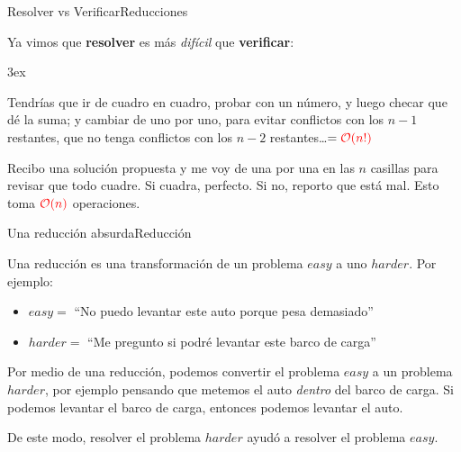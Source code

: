 \documentclass[spanish, c]{beamer}
\newcommand{\bigO}{\mathcal{O}}
\begin{document}
\begin{frame}{Resolver vs Verificar}{Reducciones}

    Ya vimos que \textbf{resolver} es más \textit{difícil} que \textbf{verificar}:

    \bigskip

    \begin{description}[style=unboxed]
        \itemsep3ex
        \item [Resolver un sudoku.]
        Tendrías que ir de cuadro en cuadro, probar con un número, y luego checar que dé la suma; y cambiar de uno por uno, para evitar conflictos con los $n-1$ restantes, que no tenga conflictos con los $n-2$ restantes\dots $= {\color{red} \bigO(n!)}$ \pause
        \item [Verificar la solución de un sudoku.]
        Recibo una solución propuesta y me voy de una por una en las $n$ casillas para revisar que todo cuadre. Si cuadra, perfecto. Si no, reporto que está mal. Esto toma ${\color{red} \bigO(n)}$ operaciones.
    \end{description}
\end{frame}

\begin{frame}{Una reducción absurda}{Reducción}

    Una \alert{reducción} es una transformación de un problema $easy$ a uno $harder$. Por ejemplo:
    
    \bigskip

    \begin{itemize}
        \item $easy = $ ``No puedo levantar este auto porque pesa demasiado'' \pause
        \item $harder = $ ``Me pregunto si podré levantar este barco de carga''
    \end{itemize} \pause

    \bigskip

    Por medio de una reducción, podemos convertir el problema $easy$ a un problema $harder$, por ejemplo pensando que metemos el auto \textit{dentro} del barco de carga. Si podemos levantar el barco de carga, entonces podemos levantar el auto. \pause

    \bigskip

    De este modo, resolver el problema $harder$ ayudó a resolver el problema $easy$.

\end{frame}
\end{document}
